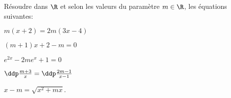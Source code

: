 
\begin{exercice} 
R\'esoudre dans $\R$ et selon les valeurs du param\`etre $m\in\R$, les \'equations suivantes:
\begin{enumerate}
\begin{minipage}[t]{0.45\textwidth}
\item $m(x+2)=2m(3x-4)$
\item $(m+1)x+2-m=0$
\item $e^{2x}-2me^x+1=0$
\end{minipage}
\begin{minipage}[t]{0.45\textwidth}
\item $\ddp\frac{m+3}{x}=\ddp\frac{2m-1}{x-1}$
\item $x-m=\sqrt{x^2+mx}.$
\end{minipage}
\end{enumerate}
\end{exercice}
